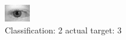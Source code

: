 \begin{figure}[h!]
\begin{center}
\includegraphics[width=0.60\columnwidth]{figures/ID518_class_2_target_3.png}
\end{center}
\caption{ Classification: 2 actual target: 3}
\label{fig:ID518_class_2_target_3}
\end{figure}
